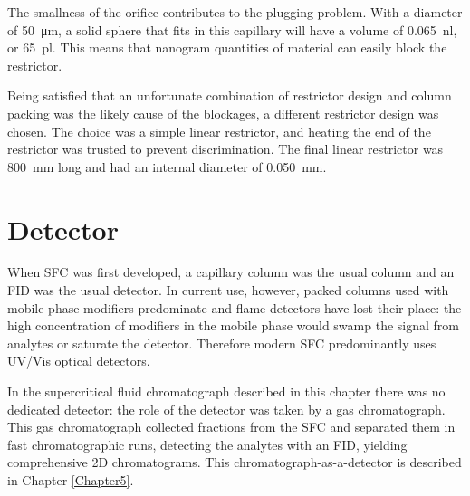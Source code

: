The smallness of the orifice contributes to the plugging problem. With a
diameter of \SI{50}{\micro\metre}, a solid sphere that fits in this capillary
will have a volume of \SI{0.065}{\nano\litre}, or \SI{65}{\pico\litre}. This
means that nanogram quantities of material can easily block the restrictor.

Being satisfied that an unfortunate combination of restrictor design and column
packing was the likely cause of the blockages, a different restrictor design was
chosen. The choice was a simple linear restrictor, and heating the end of the
restrictor was trusted to prevent discrimination. The final linear restrictor
was \SI{800}{\milli\metre} long and had an internal diameter of
\SI{0.050}{\milli\metre}.

\section{Detector}

When SFC was first developed, a capillary column was the usual column and an FID
was the usual detector. In current use, however, packed columns used with mobile
phase modifiers predominate and flame detectors have lost their place:
the high concentration of modifiers in the mobile phase would swamp the signal
from analytes or saturate the detector. Therefore modern SFC predominantly uses
UV/Vis optical detectors.

In the supercritical fluid chromatograph described in this chapter there was no
dedicated detector: the role of the detector was taken by a gas chromatograph.
This gas chromatograph collected fractions from the SFC and separated them in
fast chromatographic runs, detecting the analytes with an FID, yielding
comprehensive 2D chromatograms. This chromatograph-as-a-detector is described in
Chapter \ref{Chapter5}.
